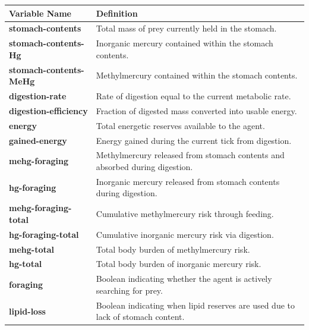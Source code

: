 \documentclass[
]{book}
\begin{document}
\begin{longtable}[]{@{}
  >{\raggedright\arraybackslash}p{}
  >{\raggedright\arraybackslash}p{}@{}}
\toprule\noalign{}
\begin{minipage}[b]{\linewidth}\raggedright
Variable Name
\end{minipage} & \begin{minipage}[b]{\linewidth}\raggedright
Definition
\end{minipage} \\
\midrule\noalign{}
\endhead
\bottomrule\noalign{}
\endlastfoot
\textbf{stomach-contents} & Total mass of prey currently held in the stomach. \\
\textbf{stomach-contents-Hg} & Inorganic mercury contained within the stomach contents. \\
\textbf{stomach-contents-MeHg} & Methylmercury contained within the stomach contents. \\
\textbf{digestion-rate} & Rate of digestion equal to the current metabolic rate. \\
\textbf{digestion-efficiency} & Fraction of digested mass converted into usable energy. \\
\textbf{energy} & Total energetic reserves available to the agent. \\
\textbf{gained-energy} & Energy gained during the current tick from digestion. \\
\textbf{mehg-foraging} & Methylmercury released from stomach contents and absorbed during digestion. \\
\textbf{hg-foraging} & Inorganic mercury released from stomach contents during digestion. \\
\textbf{mehg-foraging-total} & Cumulative methylmercury risk through feeding. \\
\textbf{hg-foraging-total} & Cumulative inorganic mercury risk via digestion. \\
\textbf{mehg-total} & Total body burden of methylmercury risk. \\
\textbf{hg-total} & Total body burden of inorganic mercury risk. \\
\textbf{foraging} & Boolean indicating whether the agent is actively searching for prey. \\
\textbf{lipid-loss} & Boolean indicating when lipid reserves are used due to lack of stomach content. \\
\end{longtable}
\end{document}
